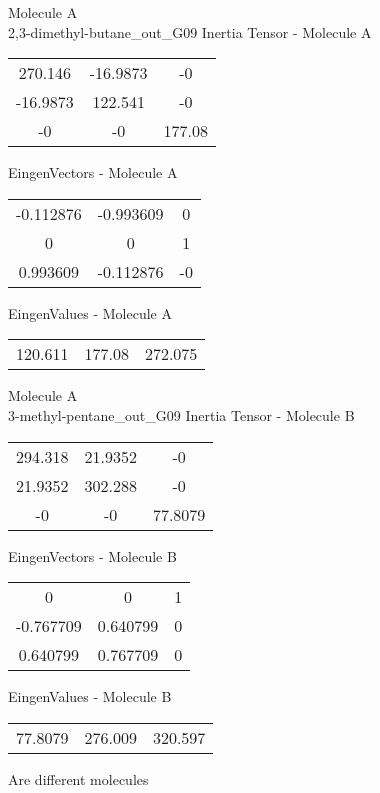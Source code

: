 \newpage
\begin{multicols}{2}
\begin{center}
Molecule A \\ 
2,3-dimethyl-butane_out_G09
Inertia Tensor - Molecule A \\
\vtab
\begin{tabular}{|c c c|}
270.146	 & 	-16.9873	 & 	-0	 \\
-16.9873	 & 	122.541	 & 	-0	 \\
-0	 & 	-0	 & 	177.08
\end{tabular}

\vtab
 EingenVectors - Molecule A     \\
\vtab
\begin{tabular}{|c c c|}
-0.112876	 & 	-0.993609	 & 	0	 \\
0	 & 	0	 & 	1	 \\
0.993609	 & 	-0.112876	 & 	-0
\end{tabular}

\vtab
 EingenValues - Molecule A     \\
\vtab
\begin{tabular}{|c c c|}
120.611	 & 	177.08	 & 	272.075
\end{tabular}
\columnbreak
Molecule A \\ 
3-methyl-pentane_out_G09
Inertia Tensor - Molecule B \\
\vtab
\begin{tabular}{|c c c|}
294.318	 & 	21.9352	 & 	-0	 \\
21.9352	 & 	302.288	 & 	-0	 \\
-0	 & 	-0	 & 	77.8079
\end{tabular}

\vtab
 EingenVectors - Molecule B     \\
\vtab
\begin{tabular}{|c c c|}
0	 & 	0	 & 	1	 \\
-0.767709	 & 	0.640799	 & 	0	 \\
0.640799	 & 	0.767709	 & 	0
\end{tabular}

\vtab
 EingenValues - Molecule B     \\
\vtab
\begin{tabular}{|c c c|}
77.8079	 & 	276.009	 & 	320.597
\end{tabular}
\textcolor{NavyBlue}{\large Are different molecules}
\end{center}
\end{multicols}
